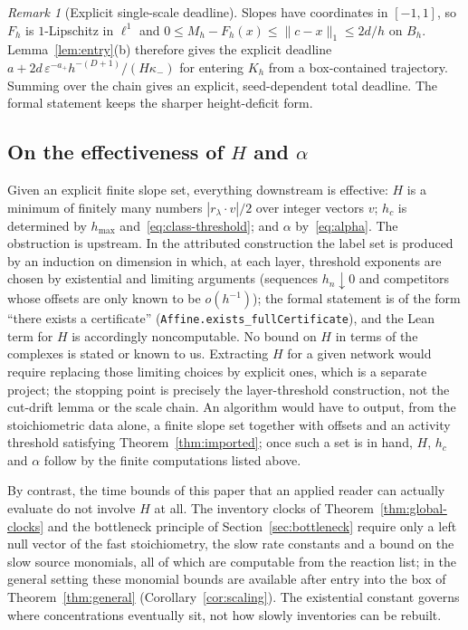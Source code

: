\documentclass[11pt,a4paper]{article}
\theoremstyle{plain}
\theoremstyle{definition}
\theoremstyle{remark}
\newtheorem{remark}[theorem]{Remark}
\newcommand{\eps}{\varepsilon}
\newcommand{\lean}[1]{\texttt{#1}}
\begin{document}
\begin{remark}[Explicit single-scale deadline]
Slopes have coordinates in $[-1,1]$, so $F_h$ is $1$-Lipschitz in $\ell^1$ and $0\le M_h-F_h(x)\le\|c-x\|_1\le2d/h$ on $B_h$. Lemma~\ref{lem:entry}(b) therefore gives the explicit deadline $a+2d\,\eps^{-a_+}h^{-(D+1)}/(H\kappa_-)$ for entering $K_h$ from a box-contained trajectory. Summing over the chain gives an explicit, seed-dependent total deadline. The formal statement keeps the sharper height-deficit form.
\end{remark}

\subsection{On the effectiveness of \texorpdfstring{$H$ and $\alpha$}{H and alpha}}
\label{sec:effective-H}
Given an explicit finite slope set, everything downstream is effective: $H$ is a minimum of finitely many numbers $|r_\lambda\cdot v|/2$ over integer vectors $v$; $h_c$ is determined by $h_{\max}$ and~\eqref{eq:class-threshold}; and $\alpha$ by~\eqref{eq:alpha}. The obstruction is upstream. In the attributed construction the label set is produced by an induction on dimension in which, at each layer, threshold exponents are chosen by existential and limiting arguments (sequences $h_n\downarrow0$ and competitors whose offsets are only known to be $o(h^{-1})$); the formal statement is of the form ``there exists a certificate'' (\lean{Affine.exists\_fullCertificate}), and the Lean term for $H$ is accordingly noncomputable. No bound on $H$ in terms of the complexes is stated or known to us. Extracting $H$ for a given network would require replacing those limiting choices by explicit ones, which is a separate project; the stopping point is precisely the layer-threshold construction, not the cut-drift lemma or the scale chain. An algorithm would have to output, from the stoichiometric data alone, a finite slope set together with offsets and an activity threshold satisfying Theorem~\ref{thm:imported}; once such a set is in hand, $H$, $h_c$ and $\alpha$ follow by the finite computations listed above.

By contrast, the time bounds of this paper that an applied reader can actually evaluate do not involve $H$ at all. The inventory clocks of Theorem~\ref{thm:global-clocks} and the bottleneck principle of Section~\ref{sec:bottleneck} require only a left null vector of the fast stoichiometry, the slow rate constants and a bound on the slow source monomials, all of which are computable from the reaction list; in the general setting these monomial bounds are available after entry into the box of Theorem~\ref{thm:general} (Corollary~\ref{cor:scaling}). The existential constant governs where concentrations eventually sit, not how slowly inventories can be rebuilt.
\end{document}
